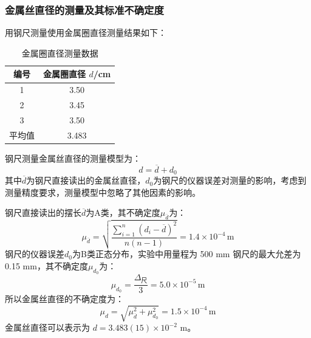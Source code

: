 \documentclass[a4paper]{extarticle}
\begin{document}
    \subsubsection{金属丝直径的测量及其标准不确定度}
    \hspace{2em}
    用钢尺测量使用金属圈直径测量结果如下：
    \begin{table}[H]
        \centering
        \caption{金属圈直径测量数据}
        \begin{tabular}{cc}
            \toprule
            编号 & 金属圈直径 $d$/cm\\
            \midrule
            1 & 3.50\\
            2 & 3.45\\
            3 & 3.50\\
            \midrule
            平均值 & 3.483\\
            \bottomrule
        \end{tabular}
    \end{table}
    \hspace{2em}
    钢尺测量金属丝直径的测量模型为：
    \begin{equation}
        d=\overline{d}+d_0
        \label{eq:d}
    \end{equation}
    其中$\overline{d}$为钢尺直接读出的金属丝直径，$d_0$为钢尺的仪器误差对测量的影响，考虑到测量精度要求，测量模型中忽略了其他因素的影响。
    \par\hspace{2em}
    钢尺直接读出的摆长$\overline{d}$为A类，其不确定度$\mu_{\overline{d}}$为：
    \begin{equation*}
        \mu_{\overline{d}}=\sqrt{\frac{\sum\limits_{i=1}^{n}(d_i-\overline{d})^2}{n(n-1)}}=1.4\times10^{-4}\,\text{m}
    \end{equation*}
    \hspace{2em}
    钢尺的仪器误差$d_0$为B类正态分布，实验中用量程为 500 mm 钢尺的最大允差为 0.15 mm，其不确定度$\mu_{d_0}$为：
    \begin{equation*}
        \mu_{d_0}=\frac{\Delta_\text{尺}}{3}=5.0\times10^{-5}\,\text{m}
    \end{equation*}
    \hspace{2em}
    所以金属丝直径的不确定度为：
    \begin{equation*}
        \mu_d=\sqrt{\mu_{\overline{d}}^2+\mu_{d_0}^2}=1.5\times10^{-4}\,\text{m}
    \end{equation*}
    金属丝直径可以表示为 $d=3.483(15)\times10^{-2}$ m。
\end{document}
